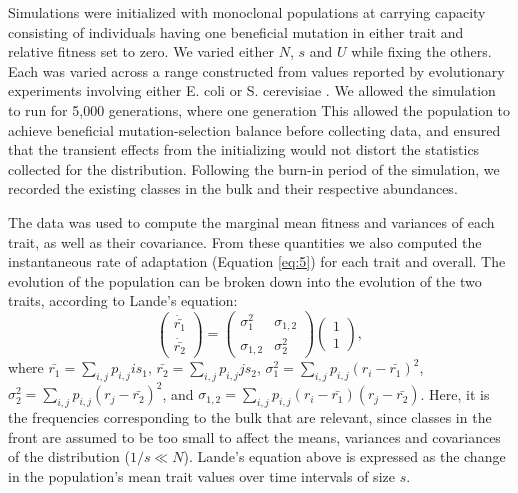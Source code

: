 \documentclass[9pt,twocolumn,twoside]{gsajnl}
\begin{document}
Simulations were initialized with monoclonal populations at carrying capacity consisting of individuals having one beneficial mutation in either trait and relative fitness set to zero. We varied either $N$, $s$ and $U$ while fixing the others. Each was varied across a range constructed from values reported by evolutionary experiments involving either E. coli or S. cerevisiae \citep{desai2007speed,Levy2015,Perfeito2007}.  We allowed the simulation to run for 5,000 generations, where one generation  This allowed the population to achieve beneficial mutation-selection balance before collecting data, and ensured that the transient effects from the initializing would not distort the statistics collected for the distribution. Following the burn-in period of the simulation, we recorded the existing classes in the bulk and their respective abundances. \par

The data was used to compute the marginal mean fitness and variances of each trait, as well as their covariance. From these quantities we also computed the instantaneous rate of adaptation (Equation \eqref{eq:5}) for each trait and overall.
The evolution of the population can be broken down into the evolution of the two traits, according to Lande's equation:
\begin{equation}\label{eq:5}
\left( \begin{array}{c}
\dot{\bar{r_1}} \\
\dot{\bar{r_2}} 
\end{array} \right)
=
\left( \begin{array}{cc}
\sigma_1^2 & \sigma_{1,2} \\
\sigma_{1,2} & \sigma_2^2 
\end{array}\right)
\left(\begin{array}{c}
1 \\
1 
\end{array}\right),
\end{equation}
where  $\bar{r_1}=\sum_{i,j} p_{i,j} is_1$, $\bar{r_2}=\sum_{i,j} p_{i,j} j s_2$, $\sigma_1^2 = \sum_{i,j} p_{i,j} (r_i-\bar{r_1})^2$, $\sigma_2^2 = \sum_{i,j} p_{i,j} (r_j-\bar{r_2})^2$, and  $\sigma_{1,2} =\sum_{i,j} p_{i,j} (r_i-\bar{r_1})(r_j-\bar{r_2})$. Here, it is the frequencies corresponding to the bulk that are relevant, since classes in the front are assumed to be too small to affect the means, variances and covariances of the distribution  ($1/s \ll N$).   Lande's equation above is expressed as the change in the population's mean trait values over time intervals of size $s$. \par
\end{document}
